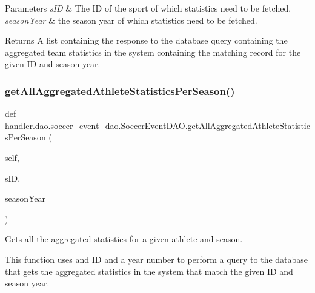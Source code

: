 \begin{DoxyParams}{Parameters}
{\em s\+ID} & The ID of the sport of which statistics need to be fetched. \\
\hline
{\em season\+Year} & the season year of which statistics need to be fetched.\\
\hline
\end{DoxyParams}
\begin{DoxyReturn}{Returns}
A list containing the response to the database query containing the aggregated team statistics in the system containing the matching record for the given ID and season year. 
\end{DoxyReturn}
\mbox{\label{classhandler_1_1dao_1_1soccer__event__dao_1_1_soccer_event_d_a_o_aa1ebbf9509867d1da215d75065baa6d2}} 
\subsubsection{\texorpdfstring{get\+All\+Aggregated\+Athlete\+Statistics\+Per\+Season()}{getAllAggregatedAthleteStatisticsPerSeason()}}
{\footnotesize\ttfamily def handler.\+dao.\+soccer\+\_\+event\+\_\+dao.\+Soccer\+Event\+D\+A\+O.\+get\+All\+Aggregated\+Athlete\+Statistics\+Per\+Season (\begin{DoxyParamCaption}\item[{}]{self,  }\item[{}]{s\+ID,  }\item[{}]{season\+Year }\end{DoxyParamCaption})}



Gets all the aggregated statistics for a given athlete and season. 

This function uses and ID and a year number to perform a query to the database that gets the aggregated statistics in the system that match the given ID and season year.


